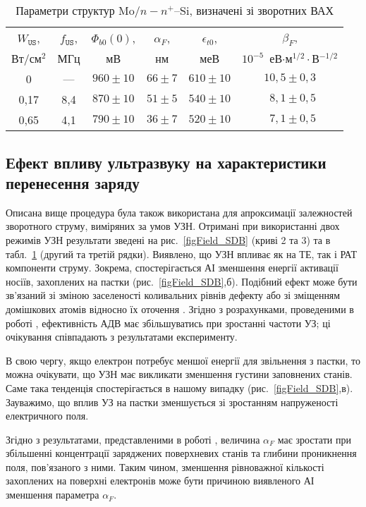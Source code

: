 \begin{table}
\caption{Параметри структур Mo$/n-n^+$--Si, визначені зі зворотних ВАХ}
\label{tabSDBParZv}
\centering
\begin{tabular}{|c|c|c|c|c|c|}
\hline
$W_\mathtt{US}$, &$f_\mathtt{US}$,&$\Phi_{b0}(0)$,&$\alpha_F$,&$\epsilon_{t0}$,&$\beta_F$,\\
Вт/см$^2$&МГц&мВ&нм&меВ&$10^{-5}$~еВ$\cdot$м$^{1/2}\cdot$В$^{-1/2}$\\\hline
0&---&$960\pm10$&$66\pm7$&$610\pm10$&$10,5\pm0,3$\\\hline
0,17&8,4&$870\pm10$&$51\pm5$&$540\pm10$&$\;\:8,1\pm0,5$\\\hline
0,65&4,1&$790\pm10$&$36\pm7$&$520\pm10$&$\;\:7,1\pm0,5$\\\hline
\end{tabular}
\end{table}



\subsection{Ефект впливу ультразвуку на характеристики перенесення заряду}

Описана вище процедура була також використана для апроксимації залежностей зворотного струму, виміряних за умов УЗН.
Отримані при використанні двох режимів УЗН результати зведені на рис.~\ref{figField_SDB} (криві 2 та 3) та в табл.~\ref{tabSDBParZv} (другий та третій рядки).
Виявлено, що УЗН впливає як на ТЕ, так і РАТ компоненти струму.
Зокрема, спостерігається АІ зменшення енергії активації носіїв, захоплених на пастки (рис.~\ref{figField_SDB},б).
Подібний ефект може бути зв'язаний зі зміною заселеності коливальних рівнів дефекту \cite{Pavlovich} або зі зміщенням домішкових
атомів відносно їх оточення \cite{Korotchenkov1995}.
Згідно з розрахунками, проведеними в роботі \cite{Pavlovich}, ефективність АДВ має збільшуватись при зростанні частоти УЗ;
ці очікування співпадають з результатами експерименту.

В свою чергу, якщо електрон потребує меншої енергії для звільнення з пастки,
то можна очікувати, що УЗН має викликати зменшення густини заповнених станів.
Саме така тенденція спостерігається в нашому випадку (рис.~\ref{figField_SDB},в).
Зауважимо, що вплив УЗ на пастки зменшується зі зростанням напруженості електричного поля.

Згідно з результатами, представленими в роботі \cite{Em:Parker},
величина $\alpha_F$ має зростати при збільшенні концентрації заряджених поверхневих станів та
глибини проникнення поля, пов'язаного  з ними.
Таким чином, зменшення рівноважної кількості захоплених на поверхні електронів може бути причиною виявленого АІ
зменшення параметра $\alpha_F$.


